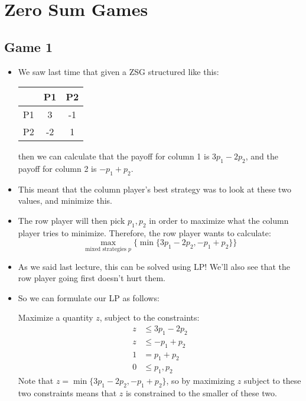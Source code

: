 \section{Zero Sum Games}
\subsection{Game 1}
\begin{itemize}
	\item We saw last time that given a ZSG structured like this:
		\begin{center}
			\begin{tabular}{c|c|c}
				& P1& P2\\
				\hline 
				P1 & 3 & -1\\
				\hline
				P2 & -2 & 1
			\end{tabular}
		\end{center}
		then we can calculate that the payoff for column 1 is \(3p_1 - 2p_2\), and the payoff for column 
		2 is \(-p_1 + p_2\).
	\item This meant that the column player's best strategy was to look at these two values, and minimize this.  
	\item The row player will then pick \(p_1, p_2\) in order to maximize what the column player tries to 
		minimize. Therefore, the row player wants to calculate:
		\[
			\max_{\text{mixed strategies \(p\)}} \{\min \{3p_1 - 2p_2, -p_1 + p_2\} \} 
		\] 
	\item As we said last lecture, this can be solved using LP! We'll also see that the row player going 
		first doesn't hurt them. 
	\item So we can formulate our LP as follows:

		Maximize a quantity \(z\), subject to the constraints:
		\begin{align*}
			z & \le 3p_1 - 2p_2\\
			z &\le -p_1 + p_2\\
			1 &= p_1 + p_2\\
			0 &\le p_1, p_2
		\end{align*}
		Note that \(z = \min \{3p_1 - 2p_2, -p_1 + p_2\} \), so by maximizing \(z\) subject to these two 
		constraints means that \(z\) is constrained to the smaller of these two. 
\end{itemize}
